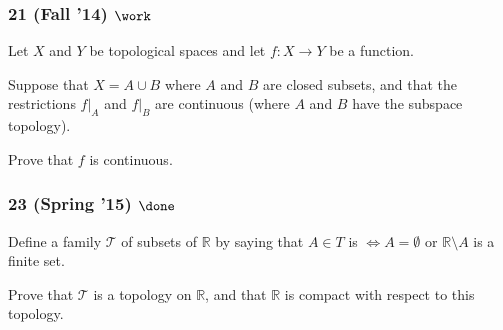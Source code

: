 \hypertarget{fall-14-work}{%
\subsubsection{\texorpdfstring{21 (Fall '14)
\(\work\)}{21 (Fall '14) \textbackslash work}}\label{fall-14-work}}

\begin{problem}[?]

Let \(X\) and \(Y\) be topological spaces and let \(f : X \to Y\) be a
function.

Suppose that \(X = A \cup B\) where \(A\) and \(B\) are closed subsets,
and that the restrictions \(f \mathrel{\Big|}_A\) and
\(f \mathrel{\Big|}_B\) are continuous (where \(A\) and \(B\) have the
subspace topology).

Prove that \(f\) is continuous.

\end{problem}

\hypertarget{spring-15-done}{%
\subsubsection{\texorpdfstring{23 (Spring '15)
\(\done\)}{23 (Spring '15) \textbackslash done}}\label{spring-15-done}}

\begin{problem}[?]

Define a family \({\mathcal{T}}\) of subsets of \({\mathbb{R}}\) by
saying that \(A \in T\) is \(\iff A = \emptyset\) or
\({\mathbb{R}}\setminus A\) is a finite set.

Prove that \({\mathcal{T}}\) is a topology on \({\mathbb{R}}\), and that
\({\mathbb{R}}\) is compact with respect to this topology.

\end{problem}

